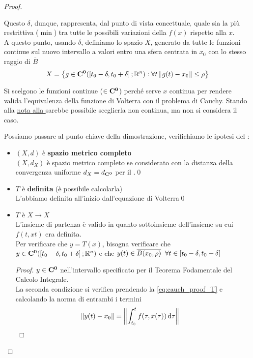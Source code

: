 \begin{theorem}
\begin{proof}
\begin{itemize}
		\end{itemize}
		Questo $\delta$, dunque, rappresenta, dal punto di vista concettuale, quale sia la più restrittiva ($\min$) tra tutte le possibili variazioni della $f(x)$ rispetto alla $x$.\\
		A questo punto, usando $\delta$, definiamo lo spazio $X$, generato da tutte le funzioni continue sul nuovo intervallo a valori entro una sfera centrata in $x_0$ con lo stesso raggio di $\overline{B}$
		\[X = \left\{g\in \mathbf{C^{0}}(\left[t_0-\delta,t_0+\delta\right];\mathbb{R}^n):\forall t\left\|g(t)-x_0\right\|\leq \rho\right\}\]
		\begin{note}
			Si scelgono le funzioni continue ($\in \mathbf{C^{0}}$) perché serve $x$ continua per rendere valida l'equivalenza della funzione di Volterra con il problema di Cauchy. Stando alla \hyperlink{note:volterra_non_cont}{nota alla } sarebbe possibile sceglierla non continua, ma non si considera il caso.
		\end{note}
		Possiamo passare al punto chiave della dimostrazione, verifichiamo le ipotesi del :
		\begin{itemize}
			\item $(X,d)$ è \textbf{spazio metrico completo}\\
			$(X,d_X)$ è spazio metrico completo se considerato con la distanza della convergenza uniforme $d_X = d_{\mathbf{C^{0}}}$ per il .\qed
			\item $T$ è \textbf{definita} (è possibile calcolarla)\\
			L'abbiamo definita all'inizio dall'equazione di Volterra\qed
			\item $T$ è \boldmath$X \to X$\unboldmath\\
			L'insieme di partenza è valido in quanto sottoinsieme dell'insieme su cui $f(t,xt)$ era definita.\\
			Per verificare che $y=T(x)$, bisogna verificare che $y\in \mathbf{C^{0}}(\left[t_0-\delta,t_0+\delta\right];\mathbb{R}^n)$ e che $y(t)\in \overline{B(x_0,\rho)}\;\;\forall t \in \left[t_0-\delta,t_0+\delta\right]$
			\begin{proof}
				$y\in \mathbf{C^{0}}$ nell'intervallo specificato per il Teorema Fodamentale del Calcolo Integrale.\\
				La seconda condizione si verifica prendendo la \cref{eq:cauch_proof_T} e calcolando la norma di entrambi i termini
				\begin{align*}
					\norm{y(t)-x_0} &= \norm{\int_{t_0}^t f(\tau,x(\tau))\integrald{\tau} }

\end{align*}
\end{proof}
\end{itemize}
\end{proof}
\end{theorem}
